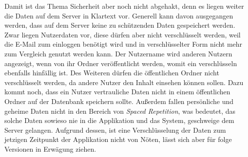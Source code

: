 Damit ist das Thema Sicherheit aber noch nicht abgehakt, denn es liegen weiter die Daten auf dem Server in Klartext vor. Generell kann davon ausgegangen werden, dass auf dem Server keine zu schützenden Daten gespeichert werden. Zwar liegen Nutzerdaten vor, diese dürfen aber nicht verschlüsselt werden, weil die E-Mail zum einloggen benötigt wird und in verschlüsselter Form nicht mehr zum Vergleich genutzt werden kann. Der Nutzername wird anderen Nutzern angezeigt, wenn von ihr Ordner veröffentlicht werden, womit ein verschlüsseln ebenfalls hinfällig ist. Des Weiteren dürfen die öffentlichen Ordner nicht verschlüsselt werden, da andere Nutzer den Inhalt einsehen können sollen. Dazu kommt noch, dass ein Nutzer vertrauliche Daten nicht in einem öffentlichen Ordner auf der Datenbank speichern sollte. Außerdem fallen persönliche und geheime Daten nicht in den Bereich von \textit{Spaced Repetition}, was bedeutet, das solche Daten sowieso nie in die Applikation und das System, geschweige dem Server gelangen. Aufgrund dessen, ist eine Verschlüsselung der Daten zum jetzigen Zeitpunkt der Applikation nicht von Nöten, lässt sich aber für folge Versionen in Erwägung ziehen.


